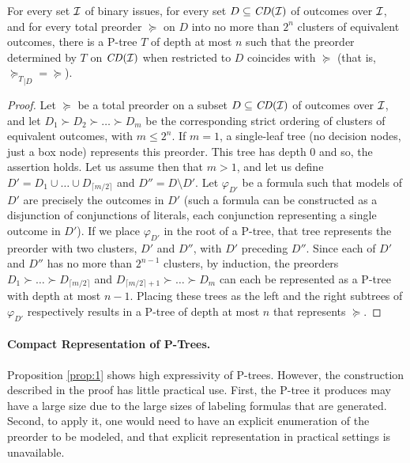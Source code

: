\begin{prop}
\label{prop:1}
For every set $\mathcal{I}$ of binary issues, for every set $D\subseteq\mathit{CD}(\mathcal{I})$
of outcomes over $\mathcal{I}$, and for every total preorder $\succeq$ on $D$ into
no more than $2^n$ clusters of equivalent outcomes, there is a P-tree $T$ 
of depth at most $n$ such that the preorder determined by $T$ on $\mathit{CD}(\mathcal{I})$ 
when restricted to $D$ coincides with $\succeq$ 
(that is, ${\succeq_T}_{|D}=\succeq$).
\end{prop}
\begin{proof}
Let $\succeq$ be a total preorder on a subset $D\subseteq \mathit{CD}(\mathcal{I})$ of outcomes
over $\mathcal{I}$, and let $D_1\succ D_2\succ \ldots\succ D_m$ be the corresponding 
strict ordering of clusters of equivalent outcomes, with $m\leq 2^n$. If
$m=1$, a single-leaf tree (no decision nodes, just a box node) represents 
this preorder. This tree has depth 0 and so, the assertion holds. Let us assume
then that $m>1$, and let us define $D'=D_1\cup\ldots\cup D_{\lceil m/2\rceil}$ 
and $D''=D\setminus
D'$. Let $\varphi_{D'}$ be a formula such that models of $D'$ 
are precisely the outcomes in $D'$ (such a formula can be constructed as a
disjunction of conjunctions of literals, each conjunction representing a
single outcome in $D'$). If we place $\varphi_{D'}$ in the root of a P-tree,
that tree represents the preorder with two clusters, $D'$ and $D''$, with 
$D'$ preceding $D''$. Since each of $D'$ and $D''$ has no more than $2^{n-1}$
clusters, by induction, the preorders $D_1\succ \ldots\succ 
D_{\lceil m/2\rceil}$ and $D_{\lceil m/2\rceil+1}\succ \ldots\succ D_m$ 
can each be represented as a P-tree with depth at most $n-1$. Placing
these trees as the left and the right subtrees of $\varphi_{D'}$ 
respectively results in a P-tree of depth at most $n$ that represents
$\succeq$. 
\end{proof}

\paragraph{\bf Compact Representation of P-Trees.}
Proposition \ref{prop:1} shows high expressivity 
of P-trees. However, the construction described in the proof has little 
practical use. First, the P-tree it produces may have a 
large size due to the large sizes of labeling formulas that are generated. 
Second, to apply it, one would need to have an explicit enumeration of 
the preorder to be modeled, and that explicit representation in practical 
settings is unavailable.         


